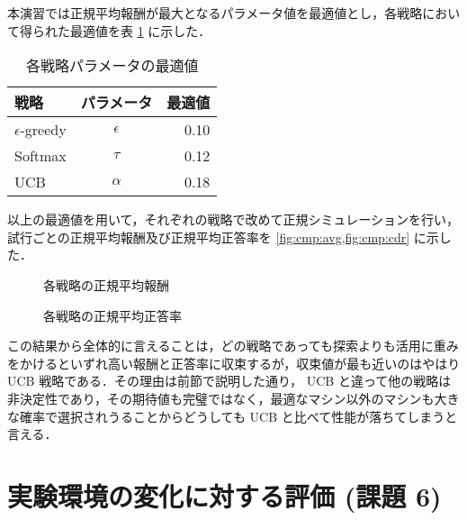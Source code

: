 \documentclass{jsarticle}
\newlength{\figwidth}
\begin{document}
本演習では正規平均報酬が最大となるパラメータ値を最適値とし，各戦略において得られた最適値を表 \ref{tab:opt_vals} に示した．

\begin{table}[H]
  \centering
  \caption{各戦略パラメータの最適値}\label{tab:opt_vals}
  \begin{tabular}{lcr}
    \toprule
    戦略 & パラメータ &  最適値 \\
    \midrule
    $\epsilon$-greedy & $\epsilon$ & 0.10 \\
    Softmax & $\tau$ & 0.12 \\
    UCB & $\alpha$ & 0.18 \\
    \bottomrule
  \end{tabular}
\end{table}

以上の最適値を用いて，それぞれの戦略で改めて正規シミュレーションを行い，試行ごとの正規平均報酬及び正規平均正答率を \cref{fig:cmp:avg,fig:cmp:cdr} に示した．

\begin{figure}[H]
\centering
{}
\caption{各戦略の正規平均報酬}\label{fig:cmp:avg}
\end{figure}

\begin{figure}[H]
\centering
{}
\caption{各戦略の正規平均正答率}\label{fig:cmp:cdr}
\end{figure}

この結果から全体的に言えることは，どの戦略であっても探索よりも活用に重みをかけるといずれ高い報酬と正答率に収束するが，収束値が最も近いのはやはり UCB 戦略である．その理由は前節で説明した通り， UCB と違って他の戦略は非決定性であり，その期待値も完璧ではなく，最適なマシン以外のマシンも大きな確率で選択されうることからどうしても UCB と比べて性能が落ちてしまうと言える．

\section{実験環境の変化に対する評価 (課題 6)}\label{sec:k6}
\end{document}
